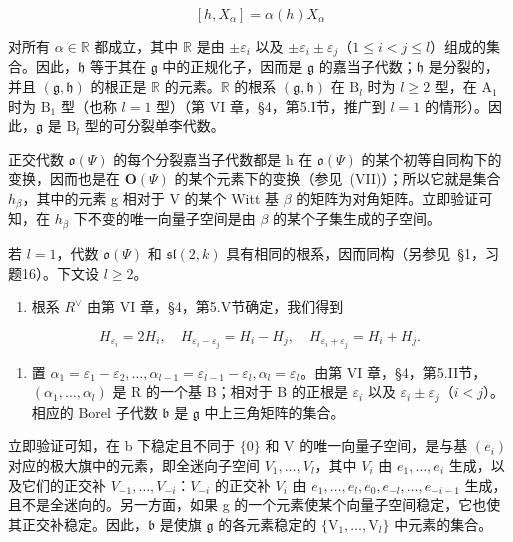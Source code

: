 \[
[ h, X _ {\alpha} ] = \alpha (h) X _ {\alpha}\tag{4}
\]

对所有 \(\alpha \in \mathbb{R}\) 都成立，其中 \(\mathbb{R}\) 是由 \(\pm \varepsilon_i\) 以及 \(\pm \varepsilon_i \pm \varepsilon_j\)（\(1 \leq i < j \leq l\)）组成的集合。因此，\(\mathfrak{h}\) 等于其在 \(\mathfrak{g}\) 中的正规化子，因而是 \(\mathfrak{g}\) 的嘉当子代数；\(\mathfrak{h}\) 是分裂的，并且 \((\mathfrak{g}, \mathfrak{h})\) 的根正是 \(\mathbb{R}\) 的元素。\(\mathbb{R}\) 的根系 \((\mathfrak{g}, \mathfrak{h})\) 在 \(\mathrm{B}_l\) 时为 \(l \geq 2\) 型，在 \(\mathrm{A}_1\) 时为 \(\mathrm{B}_1\) 型（也称 \(l = 1\) 型）（第 VI 章，§4，第5.I节，推广到 \(l = 1\) 的情形）。因此，\(\mathfrak{g}\) 是 \(\mathrm{B}_l\) 型的可分裂单李代数。

正交代数 \(\mathfrak{o}(\varPsi)\) 的每个分裂嘉当子代数都是 h 在 \(\mathfrak{o}(\varPsi)\) 的某个初等自同构下的变换，因而也是在 \(\mathbf{O}(\varPsi)\) 的某个元素下的变换（参见~(VII)）；所以它就是集合 \(h_{\beta}\)，其中的元素 g 相对于 V 的某个 Witt 基 \(\beta\) 的矩阵为对角矩阵。立即验证可知，在 \(h_{\beta}\) 下不变的唯一向量子空间是由 \(\beta\) 的某个子集生成的子空间。

若 \(l = 1\)，代数 \(\mathfrak{o}(\varPsi)\) 和 \(\mathfrak{sl}(2, k)\) 具有相同的根系，因而同构（另参见~§1，习题16）。下文设 \(l \geq 2\)。

\begin{enumerate}
\def\labelenumi{(\Roman{enumi})}
\setcounter{enumi}{1}
\tightlist
\item
  根系 \(R^{\vee}\) 由第 VI 章，§4，第5.V节确定，我们得到
\end{enumerate}

\[
H _ {\varepsilon_ {i}} = 2 H _ {i}, \quad H _ {\varepsilon_ {i} - \varepsilon_ {j}} = H _ {i} - H _ {j}, \quad H _ {\varepsilon_ {i} + \varepsilon_ {j}} = H _ {i} + H _ {j}.
\]

\begin{enumerate}
\def\labelenumi{(\Roman{enumi})}
\setcounter{enumi}{2}
\tightlist
\item
  置 \(\alpha_{1} = \varepsilon_{1} - \varepsilon_{2},\ldots ,\alpha_{l - 1} = \varepsilon_{l - 1} - \varepsilon_{l},\alpha_{l} = \varepsilon_{l}\)。由第 VI 章，§4，第5.II节，\((\alpha_{1},\dots ,\alpha_{l})\) 是 R 的一个基 B；相对于 B 的正根是 \(\varepsilon_{i}\) 以及 \(\varepsilon_{i}\pm \varepsilon_{j}\)（\(i < j\)）。相应的 Borel 子代数 \(\mathfrak{b}\) 是 \(\mathfrak{g}\) 中上三角矩阵的集合。
\end{enumerate}

立即验证可知，在 b 下稳定且不同于 \(\{0\}\) 和 V 的唯一向量子空间，是与基 \((e_{i})\) 对应的极大旗中的元素，即全迷向子空间 \(V_{1},\ldots,V_{l}\)，其中 \(V_{i}\) 由 \(e_{1},\ldots,e_{i}\) 生成，以及它们的正交补 \(V_{-1},\ldots,V_{-i}\)：\(V_{-i}\) 的正交补 \(V_{i}\) 由 \(e_{1},\ldots,e_{l},e_{0},e_{-l},\ldots,e_{-i-1}\) 生成，且不是全迷向的。另一方面，如果 g 的一个元素使某个向量子空间稳定，它也使其正交补稳定。因此，\(\mathfrak{b}\) 是使旗 \(\mathfrak{g}\) 的各元素稳定的 \(\{\mathrm{V}_1,\dots ,\mathrm{V}_l\}\) 中元素的集合。

